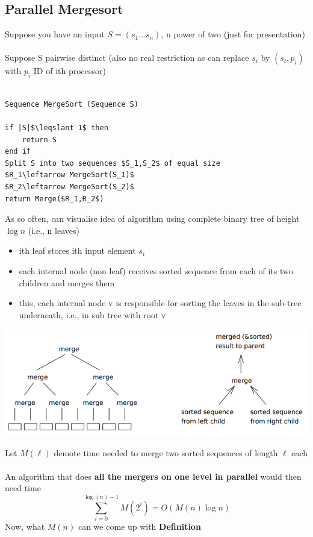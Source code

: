\documentclass{article}[18pt]
\newcommand{\seq}[3]{#1_{#2}\ldots#1_{#3}}
\begin{document}
\subsection{Parallel Mergesort}
Suppose you have an input $S=(\seq{s}{1}{n})$, n power of two (just for presentation)\\
\\
Suppose S pairwise distinct (also no real restriction as can replace $s_i$ by $(s_i,p_i)$ with $p_i$ ID of ith processor)\\
\\
\begin{lstlisting}
Sequence MergeSort (Sequence S)

if |S|$\leqslant 1$ then
	return S
end if
Split S into two sequences $S_1,S_2$ of equal size
$R_1\leftarrow MergeSort(S_1)$
$R_2\leftarrow MergeSort(S_2)$
return Merge($R_1,R_2$)
\end{lstlisting}
As so often, can visualise idea of algorithm using complete binary tree of height $\log n$ (i.e., n leaves)
\begin{itemize}
	\item ith leaf stores ith input element $s_i$
	\item each internal node (non leaf) receives sorted sequence from each of its two children and merges them
	\item this, each internal node v is responsible for sorting the leaves in the sub-tree underneath, i.e., in sub tree with root v
\end{itemize}
\begin{center}
\includegraphics[scale=0.7]{merge}
\end{center}
Let $M(\ell)$ demote time needed to merge two sorted sequences of length $\ell$ each\\
\\
An algorithm that does \textbf{all the mergers on one level in parallel} would then need time
$$\sum _ { i = 0 } ^ { \log ( n ) - 1 } M \left( 2 ^ { i } \right) = O ( M ( n ) \log n )$$
Now, what $M(n)$ can we come up with
\textbf{Definition}
\end{document}
